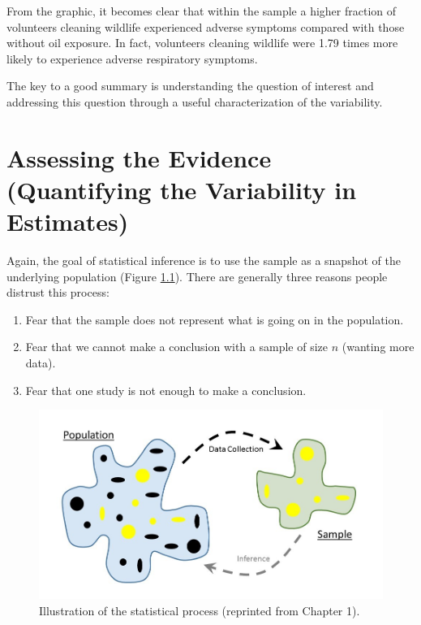 \documentclass[]{book}
\providecommand{\tightlist}{%
  \setlength{\itemsep}{0pt}\setlength{\parskip}{0pt}}
\theoremstyle{plain}
\theoremstyle{mydefn}
\theoremstyle{myexmpl}
\theoremstyle{remark}
\begin{document}
From the graphic, it becomes clear that within the sample a higher
fraction of volunteers cleaning wildlife experienced adverse symptoms
compared with those without oil exposure. In fact, volunteers cleaning
wildlife were 1.79 times more likely to experience adverse respiratory
symptoms.

The key to a good summary is understanding the question of interest and
addressing this question through a useful characterization of the
variability.

\chapter{Assessing the Evidence (Quantifying the Variability in
Estimates)}\label{SamplingDistns}

Again, the goal of statistical inference is to use the sample as a
snapshot of the underlying population (Figure
\ref{fig:samplingdistns-statistical-process}). There are generally three
reasons people distrust this process:

\begin{enumerate}
\def\labelenumi{\arabic{enumi}.}
\tightlist
\item
  Fear that the sample does not represent what is going on in the
  population.
\item
  Fear that we cannot make a conclusion with a sample of size \(n\)
  (wanting more data).
\item
  Fear that one study is not enough to make a conclusion.
\end{enumerate}

\begin{figure}

{\centering \includegraphics[width=0.8\linewidth]{images/Basics-Stat-Process} 

}

\caption{Illustration of the statistical process (reprinted from Chapter 1).}\label{fig:samplingdistns-statistical-process}
\end{figure}
\end{document}

